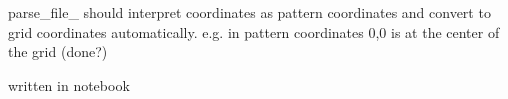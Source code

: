 
\begin{DoxyRefList}
\item[\label{todo__todo000001}%
\hypertarget{todo__todo000001}{}%
File \hyperlink{gl_8c}{gl.c} ]parse\+\_\+file\+\_ should interpret coordinates as pattern coordinates and convert to grid coordinates automatically. e.\+g. in pattern coordinates 0,0 is at the center of the grid (done?)  
\item[\label{todo__todo000002}%
\hypertarget{todo__todo000002}{}%
File \hyperlink{life_8c}{life.c} ]written in notebook 
\end{DoxyRefList}
